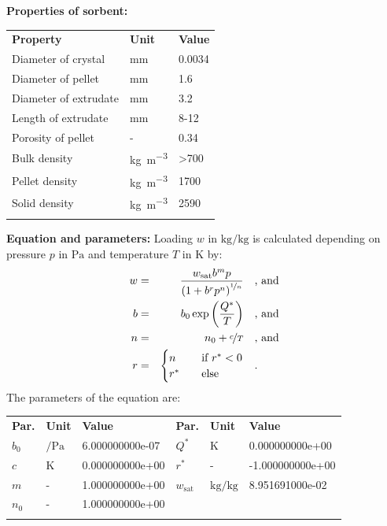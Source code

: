 \textbf{Properties of sorbent:}
\newline
%
\begin{longtable}[l]{lll}
\toprule
\addlinespace
\textbf{Property} & \textbf{Unit} & \textbf{Value} \\
\addlinespace
\midrule
\endhead
\bottomrule
\endfoot
\bottomrule
\endlastfoot
\addlinespace

Diameter of crystal & \si{\milli\meter} & 0.0034\\
Diameter of pellet & \si{\milli\meter} & 1.6\\
Diameter of extrudate & \si{\milli\meter} & 3.2\\
Length of extrudate & \si{\milli\meter} & 8-12\\
Porosity of pellet & - & 0.34\\
Bulk density & \si{\kilogram\per\cubic\meter} & >700\\
Pellet density & \si{\kilogram\per\cubic\meter} & 1700\\
Solid density & \si{\kilogram\per\cubic\meter} & 2590\\

\addlinespace\end{longtable}

\textbf{Equation and parameters:}
\newline
%
Loading $w$ in $\si{\kilogram\per\kilogram}$ is calculated depending on pressure $p$ in $\si{\pascal}$ and temperature $T$ in $\si{\kelvin}$ by:
%
\begin{equation*}
\begin{split}
w &=& \frac{w_\mathrm{sat} b^{m} p}{\left( 1 + b^{r} p^{n} \right)^{\nicefrac{1}{n}}} & \quad\text{, and} \\
b &=& b_0 \exp\left( \frac{Q^{*}}{T} \right) & \quad\text{, and} \\
n &=& n_0 + \nicefrac{c}{T} & \quad\text{, and} \\
r &=& \begin{cases} n & \quad \text{if } r^{*} < 0 \\ r^{*}  & \quad \text{else} \end{cases} & \quad\text{.}
\end{split}
\end{equation*}
%
The parameters of the equation are:
%
\begin{longtable}[l]{lll|lll}
\toprule
\addlinespace
\textbf{Par.} & \textbf{Unit} & \textbf{Value} &	\textbf{Par.} & \textbf{Unit} & \textbf{Value} \\
\addlinespace
\midrule
\endhead

\bottomrule
\endfoot
\bottomrule
\endlastfoot
\addlinespace

$b_0$ & $\si{\per\pascal}$ & 6.000000000e-07 & $Q^{*}$ & $\si{\kelvin}$ & 0.000000000e+00 \\
$c$ & $\si{\kelvin}$ & 0.000000000e+00 & $r^{*}$ & - & -1.000000000e+00 \\
$m$ & - & 1.000000000e+00 & $w_\mathrm{sat}$ & $\si{\kilogram\per\kilogram}$ & 8.951691000e-02 \\
$n_0$ & - & 1.000000000e+00 & & & \\

\addlinespace\end{longtable}

